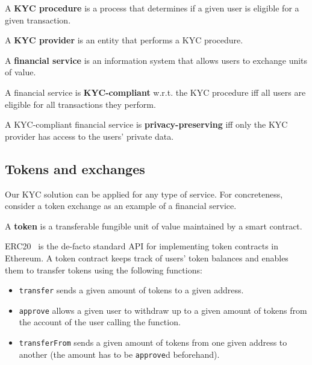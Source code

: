 \begin{definition}
	A \textbf{KYC procedure} is a process that determines if a given user is eligible for a given transaction.
\end{definition}

\begin{definition}
	A \textbf{KYC provider} is an entity that performs a KYC procedure.
\end{definition}

\begin{definition}
	A \textbf{financial service} is an information system that allows users to exchange units of value.
\end{definition}

\begin{definition}
	A financial service is \textbf{KYC-compliant} w.r.t. the KYC procedure iff all users are eligible for all transactions they perform.
\end{definition}

\begin{definition}
	A KYC-compliant financial service is \textbf{privacy-preserving} iff only the KYC provider has access to the users' private data.
\end{definition}


\subsection{Tokens and exchanges}

Our KYC solution can be applied for any type of service.
For concreteness, consider a token exchange as an example of a financial service.

\begin{definition}
	A \textbf{token} is a transferable fungible unit of value maintained by a smart contract.
\end{definition}

ERC20~\cite{Victor2019} is the de-facto standard API for implementing token contracts in Ethereum.
A token contract keeps track of users' token balances and enables them to transfer tokens using the following functions:

\begin{itemize}
	\item \texttt{transfer} sends a given amount of tokens to a given address.
	\item \texttt{approve} allows a given user to withdraw up to a given amount of tokens from the account of the user calling the function.
	\item \texttt{transferFrom} sends a given amount of tokens from one given address to another (the amount has to be \texttt{approve}d beforehand).
\end{itemize}


